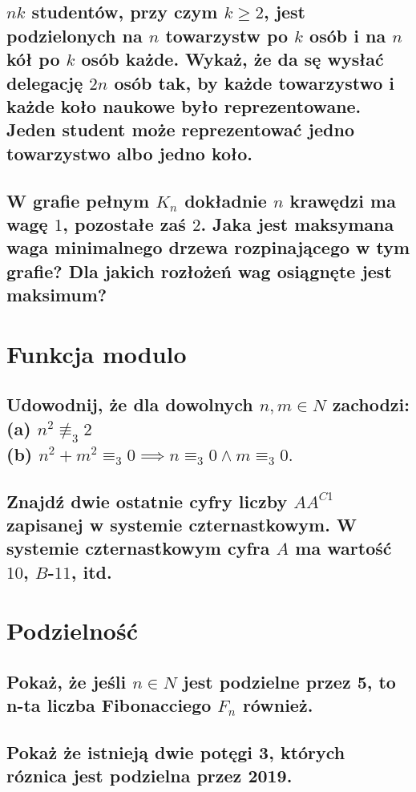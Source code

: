 \documentclass[12pt]{article}
\begin{document}
\subsection{$nk$ studentów, przy czym $k\geq 2$, jest podzielonych na $n$ towarzystw po $k$ osób i na $n$ kół po $k$ osób każde. Wykaż, że da sę wysłać delegację $2n$ osób tak, by każde towarzystwo i każde koło naukowe było reprezentowane. Jeden student może reprezentować jedno towarzystwo albo jedno koło.}

\subsection{W grafie pełnym $K_n$ dokładnie $n$ krawędzi ma wagę $1$, pozostałe zaś $2$. Jaka jest maksymana waga minimalnego drzewa rozpinającego w tym grafie? Dla jakich rozłożeń wag osiągnęte jest maksimum?}



\section{Funkcja modulo}

\subsection{Udowodnij, że dla dowolnych $n,m \in N$ zachodzi:\\ (a) $n^2 \not\equiv_3 2$ \\ (b) $n^2 + m^2 \equiv_3 0 \implies n \equiv_3 0 \land m \equiv_3 0.$}

\subsection{Znajdź dwie ostatnie cyfry liczby $AA^{C1}$ zapisanej w systemie czternastkowym. W systemie czternastkowym cyfra $A$ ma wartość $10$, $B$-$11$, itd.}

\newpage

\section{Podzielność}

\subsection{Pokaż, że jeśli $n \in N$ jest podzielne przez 5, to n-ta liczba Fibonacciego $F_n$ również.}

\subsection{Pokaż że istnieją dwie potęgi 3, których róznica jest podzielna przez 2019.}
\end{document}
